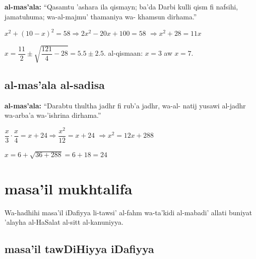 \documentclass[11pt,a4paper]{book}
\begin{document}
\begin{mathexplain}
\textbf{al-mas'ala:} ``Qasamtu 'ashara ila qismayn; ba'da Darbi
kulli qism fi nafsihi, jamatuhuma; wa-al-majmu' thamaniya wa-
khamsun dirhama.''

$x^2 + (10-x)^2 = 58 \Rightarrow 2x^2 - 20x + 100 = 58$
$\Rightarrow x^2 + 28 = 11x$

$x = \dfrac{11}{2} \pm \sqrt{\dfrac{121}{4} - 28} = 5.5 \pm 2.5$.
al-qismaan: $x = 3$ aw $x = 7$.
\end{mathexplain}

\section*{al-mas'ala al-sadisa}

\begin{mathexplain}
\textbf{al-mas'ala:} ``Darabtu thultha jadhr fi rub'a jadhr, wa-al-
natij yusawi al-jadhr wa-arba'a wa-'ishrina dirhama.''

$\dfrac{x}{3} \cdot \dfrac{x}{4} = x + 24 \Rightarrow \dfrac{x^2}{12} = x + 24$
$\Rightarrow x^2 = 12x + 288$

$x = 6 + \sqrt{36 + 288} = 6 + 18 = 24$
\end{mathexplain}

\newpage

\chapter{masa'il mukhtalifa}
\label{ch:various}

\begin{originaltext}
Wa-hadhihi masa'il iDafiyya li-tawsi' al-fahm wa-ta'kidi al-mabadi'
allati buniyat 'alayha al-HaSalat al-sitt al-kanuniyya.
\end{originaltext}

\section*{masa'il tawDiHiyya iDafiyya}
\end{document}
